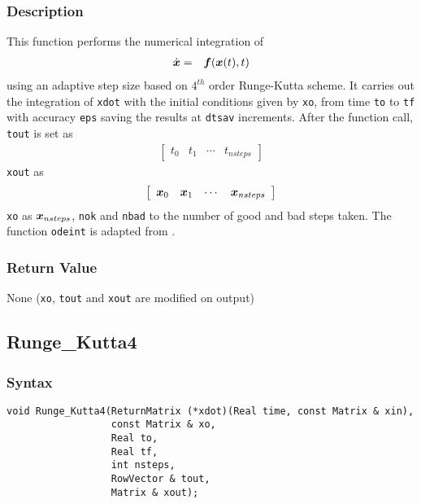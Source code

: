 \documentclass[11pt,fleqn,letterpaper]{report}
\newcommand{\mbold}[1]{\mbox{\boldmath $ #1 $}}
\newcommand{\matr}[2]{\left[\begin{array}{#1} #2 \end{array}\right]}
\begin{document}
\subsubsection*{Description}
This function performs the numerical integration of 
\begin{eqnarray}
\dot{\mbold{x}} & = & \mbold{f}(\mbold{x}(t),t)
\end{eqnarray}
using an adaptive step size based on $4^{th}$ order Runge-Kutta scheme.
It carries out the integration of {\tt xdot} with the initial conditions given by
{\tt xo}, from time {\tt to} to {\tt tf} with accuracy {\tt eps} saving the results at
{\tt dtsav} increments. After the function call, 
{\tt tout} is set as 
\begin{eqnarray}
\matr{cccc}{ t_0 & t_1 & \cdots & t_{nsteps}}
\end{eqnarray}
{\tt xout} as
\begin{eqnarray}
\matr{cccc}{ \mbold{x}_0 & \mbold{x}_1 & \cdots & \mbold{x}_{nsteps}}
\end{eqnarray}
{\tt xo} as $\mbold{x}_{nsteps}$, {\tt nok} and {\tt nbad} to the number of
good and bad steps taken. The function {\tt odeint} is adapted from \cite{press_flannery}.



\subsubsection*{Return Value}

None ({\tt xo}, {\tt tout} and {\tt xout} are modified on output)

\newpage

\subsection*{Runge\_Kutta4}
\subsubsection*{Syntax}
\begin{verbatim}
void Runge_Kutta4(ReturnMatrix (*xdot)(Real time, const Matrix & xin),
                  const Matrix & xo, 
                  Real to, 
                  Real tf, 
                  int nsteps,
                  RowVector & tout, 
                  Matrix & xout);
\end{verbatim}
\end{document}

